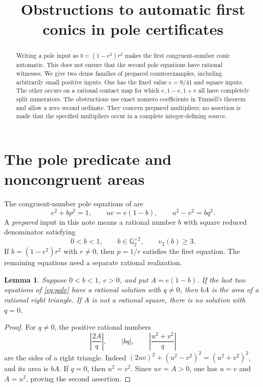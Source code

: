 \documentclass[11pt,a4paper]{article}
\title{Obstructions to automatic first conics in pole certificates}
\author{}\date{}
\newtheorem{lemma}[theorem]{Lemma}
\theoremstyle{definition}\newtheorem{definition}[theorem]{Definition}
\newcommand{\Q}{\mathbb Q}\newcommand{\Z}{\mathbb Z}
\begin{document}
\maketitle
\begin{abstract}
Writing a pole input as $b=(1-e^2)r^2$ makes the first congruent-number
conic automatic. This does not ensure that the second pole equations have
rational witnesses. We give two dense families of prepared counterexamples,
including arbitrarily small positive inputs. One has the fixed value
$e=9/41$ and square inputs. The other occurs on a rational contact map for
which $e,1-e,1+e$ all have completely split numerators. The obstructions use
exact nonzero coefficients in Tunnell's theorem and allow a zero second
ordinate. They concern prepared multipliers; no assertion is made that the
specified multipliers occur in a complete integer-defining source.
\end{abstract}

\section{The pole predicate and noncongruent areas}

The congruent-number pole equations of \cite{Pole} are
\begin{equation}\label{eq:pole}
 e^2+bp^2=1,\qquad uv=e(1-b),\qquad u^2-v^2=bq^2.
\end{equation}
A \emph{prepared} input in this note means a rational number $b$ with
square reduced denominator satisfying
\begin{equation}\label{eq:prepared}
                 0<b<1,\qquad b\in\Q_2^{\times2},\qquad v_2(b)\ge3.
\end{equation}
If $b=(1-e^2)r^2$ with $r\ne0$, then $p=1/r$ satisfies the first
equation. The remaining equations need a separate rational realization.

\begin{lemma}\label{lem:area}
Suppose $0<b<1$, $e>0$, and put $A=e(1-b)$. If the last two equations
of \eqref{eq:pole} have a rational solution with $q\ne0$, then $bA$ is
the area of a rational right triangle. If $A$ is not a rational square,
there is no solution with $q=0$.
\end{lemma}
\begin{proof}
For $q\ne0$, the positive rational numbers
\[
 \left|\frac{2A}{q}\right|,\qquad |bq|,\qquad
 \left|\frac{u^2+v^2}{q}\right|
\]
are the sides of a right triangle. Indeed
$(2uv)^2+(u^2-v^2)^2=(u^2+v^2)^2$, and its area is $bA$.
If $q=0$, then $u^2=v^2$. Since $uv=A>0$, one has $u=v$ and
$A=u^2$, proving the second assertion.
\end{proof}
\end{document}

